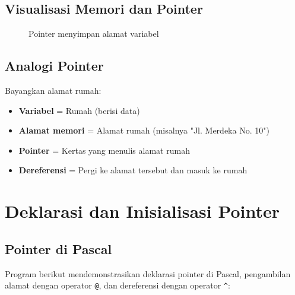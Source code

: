 \documentclass[../main.tex]{subfiles}
\begin{document}
\subsection{Visualisasi Memori dan Pointer}

\begin{figure}[H]
  \centering
  \caption{Pointer menyimpan alamat variabel}
\end{figure}

\subsection{Analogi Pointer}

Bayangkan alamat rumah:
\begin{itemize}
  \item \textbf{Variabel} = Rumah (berisi data)
  \item \textbf{Alamat memori} = Alamat rumah (misalnya "Jl. Merdeka No. 10")
  \item \textbf{Pointer} = Kertas yang menulis alamat rumah
  \item \textbf{Dereferensi} = Pergi ke alamat tersebut dan masuk ke rumah
\end{itemize}

\section{Deklarasi dan Inisialisasi Pointer}

\subsection{Pointer di Pascal}

Program berikut mendemonstrasikan deklarasi pointer di Pascal, pengambilan alamat dengan operator \texttt{@}, dan dereferensi dengan operator \texttt{\^{}}:
\end{document}
